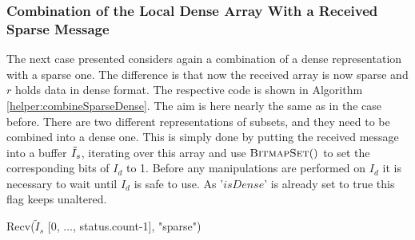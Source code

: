 \subsubsection{Combination of the Local Dense Array With a Received Sparse Message}
The next case presented considers again a combination of a dense representation with a sparse one. The difference is that now the received array is now sparse and $r$ holds data  in dense format. The respective code is shown in Algorithm \ref{helper:combineSparseDense}. The aim is here nearly the same as in the case before. There are two different representations of subsets, and they need to be combined into a dense one. This is simply done by putting the received message into a buffer $\Tilde{I}_s$, iterating over this array and use $\Call{BitmapSet}{ }$ to set the corresponding bits of $I_d$ to 1. Before any manipulations are performed on $I_d$ it is necessary to wait until $I_d$ is safe to use. As '$isDense$' is already set to true this flag keeps unaltered.
\begin{algorithm}
	\caption{– combine a received sparse list into own dense array.\\
		Variable nomenclature is the same as in Algorithm \ref{algo:SetUnionExactHalving}. Changes of variables apply to the original ones.}
	\label{helper:combineSparseDense}
	\begin{algorithmic}[1]
			\State Recv($\tilde{I}_s$ [0, $\dots$, status.count-1], "sparse")
			\State {}
				\State {}		
			\EndFor
		\EndProcedure
	\end{algorithmic}
\end{algorithm}

